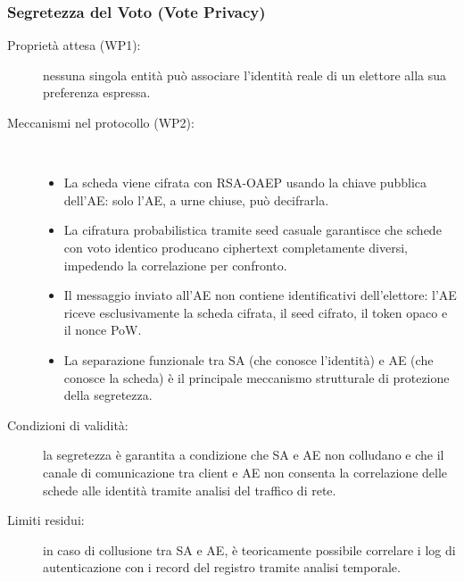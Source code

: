 \documentclass[12pt,a4paper]{article}
\begin{document}
\subsubsection{Segretezza del Voto (Vote Privacy)}
\begin{description}
  \item[Proprietà attesa (WP1):] nessuna singola entità può associare l'identità reale di un elettore alla sua preferenza espressa.
  \item[Meccanismi nel protocollo (WP2):] \
    \begin{itemize}
      \item La scheda viene cifrata con RSA-OAEP usando la chiave pubblica dell'AE: solo l'AE, a urne chiuse, può decifrarla.
      \item La cifratura probabilistica tramite seed casuale garantisce che schede con voto identico producano ciphertext completamente diversi, impedendo la correlazione per confronto.
      \item Il messaggio inviato all'AE non contiene identificativi dell'elettore: l'AE riceve esclusivamente la scheda cifrata, il seed cifrato, il token opaco e il nonce PoW.
      \item La separazione funzionale tra SA (che conosce l'identità) e AE (che conosce la scheda) è il principale meccanismo strutturale di protezione della segretezza.
    \end{itemize}
  \item[Condizioni di validità:] la segretezza è garantita a condizione che SA e AE non colludano e che il canale di comunicazione tra client e AE non consenta la correlazione delle schede alle identità tramite analisi del traffico di rete.
  \item[Limiti residui:] in caso di collusione tra SA e AE, è teoricamente possibile correlare i log di autenticazione con i record del registro tramite analisi temporale.
\end{description}
\end{document}
